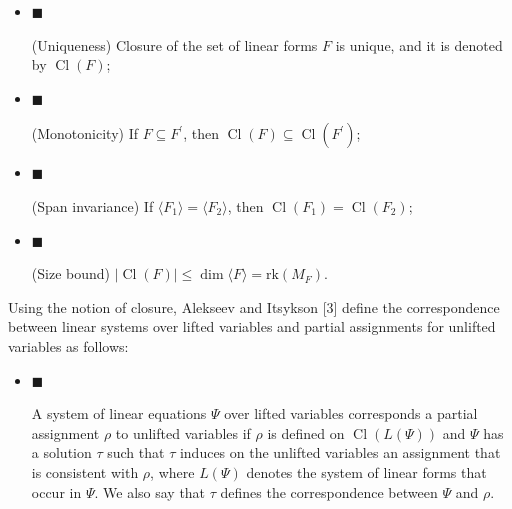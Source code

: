 \documentclass[10pt,a4paper]{article}
\begin{document}
\begin{itemize}


\item 
$\blacksquare$ 


(Uniqueness) Closure of the set of linear forms $F$ is unique, and it is denoted by $\mathop{\mathrm{Cl}}(F)$;\par





\item 
$\blacksquare$ 


(Monotonicity) If $F\subseteq F^{\prime}$, then $\mathop{\mathrm{Cl}}(F)\subseteq\mathop{\mathrm{Cl}}(F^{\prime})$;\par





\item 
$\blacksquare$ 


(Span invariance) If $\langle F_{1}\rangle=\langle F_{2}\rangle$, then $\mathop{\mathrm{Cl}}(F_{1})=\mathop{\mathrm{Cl}}(F_{2})$;\par





\item 
$\blacksquare$ 


(Size bound) $|\mathop{\mathrm{Cl}}(F)|\leq\dim\langle F\rangle=\mathrm{rk}\left(M_{F}\right)$.\par





\end{itemize}



Using the notion of closure, Alekseev and Itsykson [3] define the correspondence between linear systems over lifted variables and partial assignments for unlifted variables as follows:\par


\begin{itemize}


\item 
$\blacksquare$ 


A system of linear equations $\Psi$ over lifted variables corresponds a partial assignment $\rho$ to unlifted variables if $\rho$ is defined on $\mathop{\mathrm{Cl}}(L(\Psi))$ and $\Psi$ has a solution $\tau$ such that $\tau$ induces on the unlifted variables an assignment that is consistent with $\rho$, where $L(\Psi)$ denotes the system of linear forms that occur in $\Psi$. We also say that $\tau$ defines the correspondence between $\Psi$ and $\rho$.\par





\end{itemize}
\end{document}
